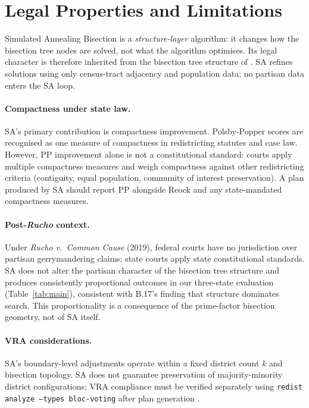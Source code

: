 \section{Legal Properties and Limitations}
\label{sec:legal}

Simulated Annealing Bisection is a \emph{structure-layer} algorithm: it
changes how the bisection tree nodes are solved, not what the algorithm
optimises.
Its legal character is therefore inherited from the bisection tree structure
of \ar{} \citep{dellaLibera2026apportion}.
SA refines \metis{} solutions using only census-tract adjacency and
population data; no partisan data enters the SA loop.

\paragraph{Compactness under state law.}
SA's primary contribution is compactness improvement.
Polsby-Popper scores are recognised as one measure of compactness in
redistricting statutes and case law.
However, PP improvement alone is not a constitutional standard: courts apply
multiple compactness measures and weigh compactness against other
redistricting criteria (contiguity, equal population, community of interest
preservation).
A plan produced by SA should report PP alongside Reock and any
state-mandated compactness measures.

\paragraph{Post-\textit{Rucho} context.}
Under \textit{Rucho v.\ Common Cause} (2019), federal courts have no
jurisdiction over partisan gerrymandering claims; state courts apply state
constitutional standards.
SA does not alter the partisan character of the bisection tree structure and
produces consistently proportional outcomes in our three-state evaluation
(Table~\ref{tab:main}), consistent with B.17's finding that structure
dominates search.
This proportionality is a consequence of the prime-factor bisection
geometry, not of SA itself.

\paragraph{VRA considerations.}
SA's boundary-level adjustments operate within a fixed district count $k$
and bisection topology.
SA does not guarantee preservation of majority-minority district
configurations; VRA compliance must be verified separately using
\texttt{redist analyze --types bloc-voting} after plan generation
\citep{dellaLibera2026callais}.

